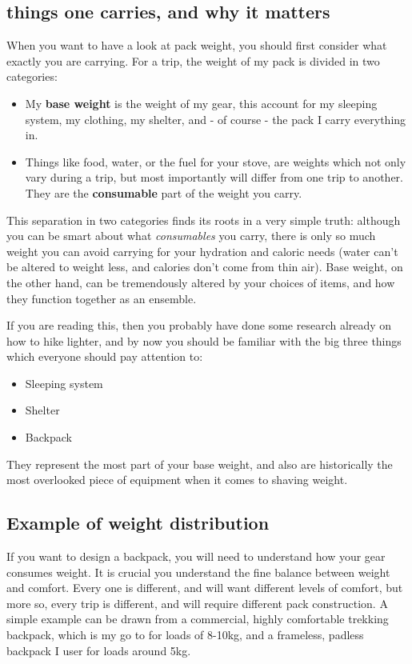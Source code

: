 
\subsection{things one carries, and why it matters}

When you want to have a look at pack weight, you should first consider what exactly you are carrying. For a trip, the weight of my pack is divided in two categories:

\begin{itemize}
	\item My \textbf{base weight} is the weight of my gear, this account for my sleeping system, my clothing, my shelter, and - of course - the pack I carry everything in.
	\item Things like food, water, or the fuel for your stove, are weights which not only vary during a trip, but most importantly will differ from one trip to another. They are the \textbf{consumable} part of the weight you carry.
\end{itemize}

This separation in two categories finds its roots in a very simple truth: although you can be smart about what \textit{consumables} you carry, there is only so much weight you can avoid carrying  for your hydration and caloric needs (water can't be altered to weight less, and calories don't come from thin air). Base weight, on the other hand, can be tremendously altered by your choices of items, and how they function together as an ensemble.

If you are reading this, then you probably have done some research already on how to hike lighter, and by now you should be familiar with the big three things which everyone should pay attention to:

\begin{itemize}
	\item Sleeping system
	\item Shelter
	\item Backpack
\end{itemize}

They represent the most part of your base weight, and also are historically the most overlooked piece of equipment when it comes to shaving weight.

\subsection{Example of weight distribution}

If you want to design a backpack, you will need to understand how your gear consumes weight. It is crucial you understand the fine balance between weight and comfort. Every one is different, and will want different levels of comfort, but more so, every trip is different, and will require different pack construction. A simple example can be drawn from a commercial, highly comfortable trekking backpack, which is my go to for loads of 8-10kg, and a frameless, padless backpack I user for loads around 5kg.

